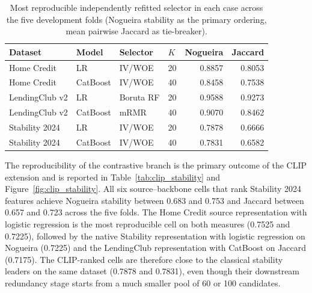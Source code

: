 \documentclass[preprint,12pt]{elsarticle}
\newcommand{\Kfeat}{K}
\begin{document}
\begin{table}[htbp]
\centering
\footnotesize
\begin{threeparttable}
\caption{Most reproducible independently refitted selector in each case across the five development folds (Nogueira stability as the primary ordering, mean pairwise Jaccard as tie-breaker).}
\label{tab:classical_stability}
\begin{tabular}{@{}llllrr@{}}
\toprule
Dataset & Model & Selector & $\Kfeat$ & Nogueira & Jaccard \\
\midrule
Home Credit & LR & IV/WOE & 20 & 0.8857 & 0.8053 \\
Home Credit & CatBoost & IV/WOE & 40 & 0.8458 & 0.7538 \\
LendingClub v2 & LR & Boruta RF & 20 & 0.9588 & 0.9273 \\
LendingClub v2 & CatBoost & mRMR & 40 & 0.9070 & 0.8462 \\
Stability 2024 & LR & IV/WOE & 20 & 0.7878 & 0.6666 \\
Stability 2024 & CatBoost & IV/WOE & 40 & 0.7831 & 0.6582 \\
\bottomrule
\end{tabular}
\end{threeparttable}
\end{table}

The reproducibility of the contrastive branch is the primary outcome of the CLIP extension and is reported in Table~\ref{tab:clip_stability} and Figure~\ref{fig:clip_stability}. All six source--backbone cells that rank Stability 2024 features achieve Nogueira stability between 0.683 and 0.753 and Jaccard between 0.657 and 0.723 across the five folds. The Home Credit source representation with logistic regression is the most reproducible cell on both measures (0.7525 and 0.7225), followed by the native Stability representation with logistic regression on Nogueira (0.7225) and the LendingClub representation with CatBoost on Jaccard (0.7175). The CLIP-ranked cells are therefore close to the classical stability leaders on the same dataset (0.7878 and 0.7831), even though their downstream redundancy stage starts from a much smaller pool of 60 or 100 candidates.
\end{document}
